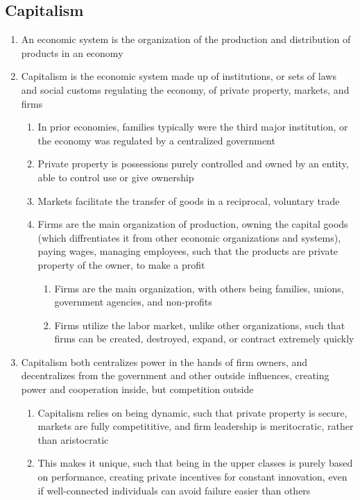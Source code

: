 \documentclass[11 pt, twoside]{article}
\begin{document}
\subsection{Capitalism}
\begin{enumerate}
\item An economic system is the organization of the production and distribution of products in an economy
\item Capitalism is the economic system made up of institutions, or sets of laws and social customs regulating the economy, of private property, markets, and firms
\begin{enumerate}
\item In prior economies, families typically were the third major institution, or the economy was regulated by a centralized government
\item Private property is possessions purely controlled and owned by an entity, able to control use or give ownership
\item Markets facilitate the transfer of goods in a reciprocal, voluntary trade
\item Firms are the main organization of production, owning the capital goods (which diffrentiates it from other economic organizations and systems), paying wages, managing employees, such that the products are private property of the owner, to make a profit
\begin{enumerate}
\item Firms are the main organization, with others being families, unions, government agencies, and non-profits
\item Firms utilize the labor market, unlike other organizations, such that firms can be created, destroyed, expand, or contract extremely quickly
\end{enumerate} 
\end{enumerate}
\item Capitalism both centralizes power in the hands of firm owners, and decentralizes from the government and other outside influences, creating power and cooperation inside, but competition outside
\begin{enumerate}
\item Capitalism relies on being dynamic, such that private property is secure, markets are fully competititive, and firm leadership is meritocratic, rather than aristocratic
\item This makes it unique, such that being in the upper classes is purely based on performance, creating private incentives for constant innovation, even if well-connected individuals can avoid failure easier than others

\end{enumerate}
\end{enumerate}
\end{document}

